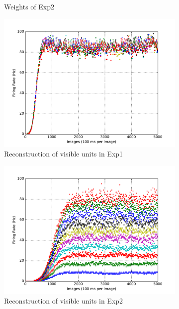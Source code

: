 \begin{figure}
\begin{subfigure}[t]{0.4\textwidth}
		\caption{Weights of Exp2}
	\end{subfigure}
	\begin{subfigure}[t]{0.4\textwidth}
		\includegraphics[width=\textwidth]{pics_sdlm/05_exp_SAE_teach_long/exp1_recon_s.pdf}
		\caption{Reconstruction of visible units in Exp1}
	\end{subfigure}
	\begin{subfigure}[t]{0.4\textwidth}
		\includegraphics[width=\textwidth]{pics_sdlm/05_exp_SAE_teach_long/exp2_recon_s.pdf}
		\caption{Reconstruction of visible units in Exp2}
	\end{subfigure}\\
	\begin{subfigure}[t]{0.4\textwidth}

\end{subfigure}
\end{figure}
